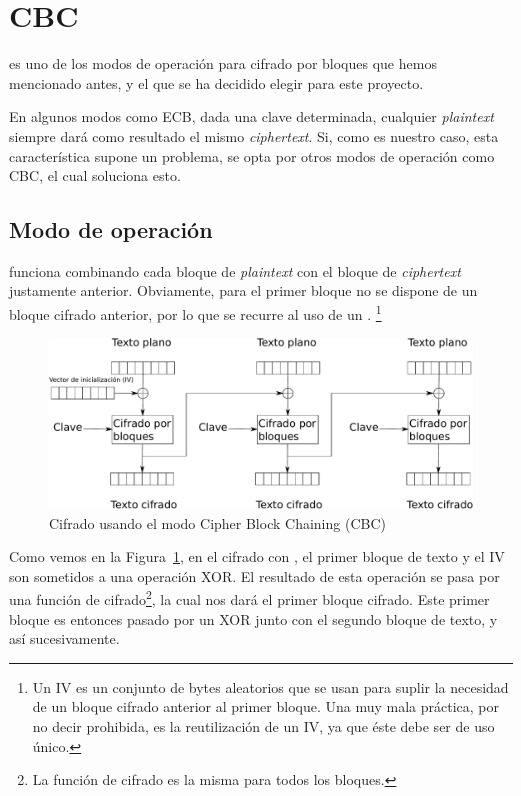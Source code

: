 
\section{CBC}

 es uno de los modos de operación para cifrado por bloques que hemos mencionado antes,
y el que se ha decidido elegir para este proyecto.

En algunos modos como ECB, dada una clave determinada,
cualquier \emph{plaintext} siempre dará como resultado el mismo \emph{ciphertext}.
Si, como es nuestro caso, esta característica supone un problema,
se opta por otros modos de operación como CBC, el cual soluciona esto. \emph{\parencite{Reference23}}

\subsection{Modo de operación}

 funciona combinando cada bloque de \emph{plaintext} con el bloque de \emph{ciphertext} justamente anterior.
Obviamente, para el primer bloque no se dispone de un bloque cifrado anterior,
por lo que se recurre al uso de un .
\footnote{Un IV es un conjunto de bytes aleatorios que se usan para suplir la necesidad de un bloque cifrado anterior al primer bloque.
Una muy mala práctica, por no decir prohibida, es la reutilización de un IV, ya que éste debe ser de uso único.}

\begin{figure}[ht]
  \centering
  \includegraphics[scale=0.5]{Figures/CBC_enc}
  \decoRule
  \caption[Cipher Block Chaining (CBC) - Cifrado]{Cifrado usando el modo Cipher Block Chaining (CBC)}
  \label{fig:CBC_enc}
\end{figure}

Como vemos en la Figura~\ref{fig:CBC_enc}, en el cifrado con , el primer bloque de texto y el IV son sometidos a una operación XOR.
El resultado de esta operación se pasa por una función de cifrado\footnote{La función de cifrado es la misma para todos los bloques.}, la cual nos dará el primer bloque cifrado.
Este primer bloque es entonces pasado por un XOR junto con el segundo bloque de texto, y así sucesivamente.

